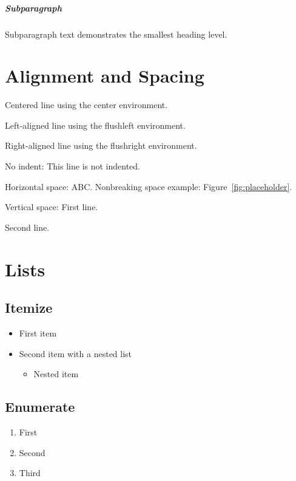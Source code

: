 \documentclass[titlepage,a4paper,12pt]{article}
\begin{document}
\subparagraph{Subparagraph}
Subparagraph text demonstrates the smallest heading level.

\section{Alignment and Spacing}
\begin{center}
  Centered line using the center environment.
\end{center}

\begin{flushleft}
  Left-aligned line using the flushleft environment.
\end{flushleft}

\begin{flushright}
  Right-aligned line using the flushright environment.
\end{flushright}

No indent: \noindent This line is not indented.

Horizontal space: A\hspace{1em}B\hfill C. Nonbreaking space example: Figure~\ref{fig:placeholder}.

Vertical space:
First line.\vspace{6pt}

Second line.

\section{Lists}
\subsection{Itemize}
\begin{itemize}
  \item First item
  \item Second item with a nested list
    \begin{itemize}
      \item Nested item
    \end{itemize}
\end{itemize}

\subsection{Enumerate}
\begin{enumerate}
  \item First
  \item Second
  \item Third
\end{enumerate}
\end{document}
